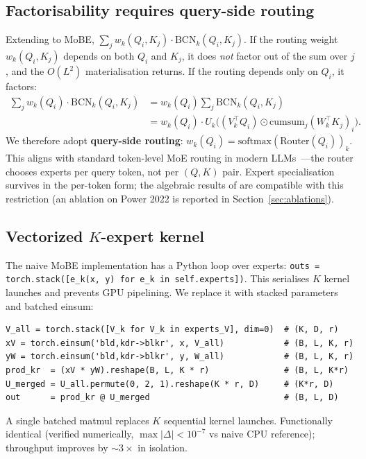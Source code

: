 \documentclass[11pt]{article}
\begin{document}
\subsection{Factorisability requires query-side routing}

Extending to MoBE, $\sum_j w_k(Q_i, K_j) \cdot \text{BCN}_k(Q_i, K_j)$.
If the routing weight $w_k(Q_i, K_j)$ depends on both $Q_i$ and $K_j$, it
does \emph{not} factor out of the sum over $j$, and the $O(L^2)$
materialisation returns. If the routing depends only on $Q_i$, it
factors:
\begin{align}
\sum_j w_k(Q_i) \cdot \text{BCN}_k(Q_i, K_j)
&= w_k(Q_i) \sum_j \text{BCN}_k(Q_i, K_j) \nonumber\\
&= w_k(Q_i) \cdot U_k \bigl((V_k^\top Q_i) \odot \mathrm{cumsum}_j(W_k^\top K_j)_i\bigr).
\end{align}
We therefore adopt \textbf{query-side routing}:
$w_k(Q_i) = \mathrm{softmax}(\text{Router}(Q_i))_k$. This aligns with
standard token-level MoE routing in modern
LLMs~\citep{shazeer2017outrageously,fedus2022switch,jiang2024mixtral}---the
router chooses experts per query token, not per $(Q, K)$ pair. Expert
specialisation survives in the per-token form; the algebraic results of
\citet{dovzak2026mobebcn} are compatible with this restriction (an
ablation on Power 2022 is reported in
Section~\ref{sec:ablations}).

\subsection{Vectorized $K$-expert kernel}
\label{sec:vectorize}

The naive MoBE implementation has a Python loop over experts:
\texttt{outs = torch.stack([e\_k(x, y) for e\_k in self.experts])}. This
serialises $K$ kernel launches and prevents GPU pipelining. We replace
it with stacked parameters and batched einsum:

\begin{lstlisting}
V_all = torch.stack([V_k for V_k in experts_V], dim=0)  # (K, D, r)
xV = torch.einsum('bld,kdr->blkr', x, V_all)            # (B, L, K, r)
yW = torch.einsum('bld,kdr->blkr', y, W_all)            # (B, L, K, r)
prod_kr  = (xV * yW).reshape(B, L, K * r)               # (B, L, K*r)
U_merged = U_all.permute(0, 2, 1).reshape(K * r, D)     # (K*r, D)
out      = prod_kr @ U_merged                           # (B, L, D)
\end{lstlisting}

A single batched matmul replaces $K$ sequential kernel launches.
Functionally identical (verified numerically, $\max |\Delta| < 10^{-7}$
vs naive CPU reference); throughput improves by $\sim\!3\times$ in
isolation.
\end{document}
